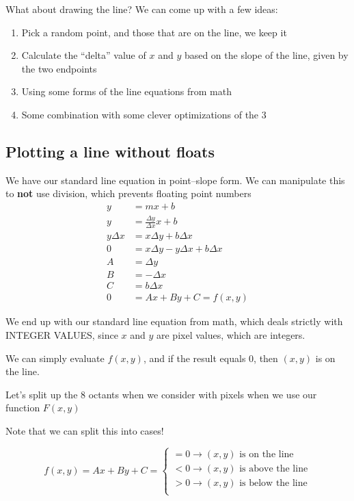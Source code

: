 \documentclass[11pt,fleqn]{article}
\theoremstyle{definition}
\begin{document}
What about drawing the line? We can come up with a few ideas:

\begin{enumerate}
    \item Pick a random point, and those that are on the line, we keep it
    \item Calculate the ``delta'' value of $x$ and $y$ based on the slope of the
        line, given by the two endpoints
    \item Using some forms of the line equations from math
    \item Some combination with some clever optimizations of the 3
\end{enumerate}

\newpage
\subsection{Plotting a line without floats}
We have our standard line equation in point--slope form. We can manipulate this to
\textbf{not} use division, which prevents floating point numbers
\begin{align*}
    y &= mx + b \\
    y &= \frac{\Delta y}{\Delta x} x + b \\
    y \Delta x &= x \Delta y + b \Delta x \\
    0 &= x \Delta y - y \Delta x + b \Delta x \\
    A &= \Delta y \\
    B &= -\Delta x \\
    C &= b \Delta x \\
    0 &= Ax + By + C = f(x, y)
\end{align*}

We end up with our standard line equation from math, which deals strictly with
INTEGER VALUES, since $x$ and $y$ are pixel values, which are integers.

We can simply evaluate $f(x,y)$, and if the result equals $0$, then $(x,y)$ is on the
line.

Let's split up the 8 octants when we consider with pixels when we use our function
$F(x,y)$

Note that we can split this into cases!

\[
    f(x,y) = Ax + By + C =
    \begin{cases}
        = 0 \rightarrow (x,y) \text{  is on the line} \\
        < 0 \rightarrow (x,y) \text{  is above the line} \\
        > 0 \rightarrow (x,y) \text{  is below the line} \\
    \end{cases}
\]
\end{document}

